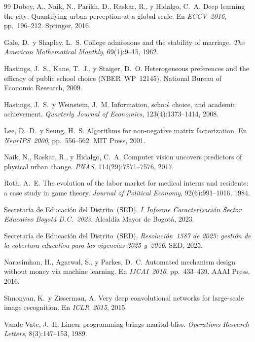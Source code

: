 \documentclass[12pt,a4paper]{article}
\begin{document}
\begin{thebibliography}{99}
Dubey, A., Naik, N., Parikh, D., Raskar, R., y Hidalgo, C.~A.
\newblock Deep learning the city: Quantifying urban perception at a global scale.
\newblock En \emph{ECCV~2016}, pp.~196--212. Springer, 2016.

Gale, D.\ y Shapley, L.~S.
\newblock College admissions and the stability of marriage.
\newblock \emph{The American Mathematical Monthly}, 69(1):9--15, 1962.

Hastings, J.~S., Kane, T.~J., y Staiger, D.~O.
\newblock Heterogeneous preferences and the efficacy of public school choice
(NBER~WP~12145).
\newblock National Bureau of Economic Research, 2009.

Hastings, J.~S.\ y Weinstein, J.~M.
\newblock Information, school choice, and academic achievement.
\newblock \emph{Quarterly Journal of Economics}, 123(4):1373--1414, 2008.

Lee, D.~D.\ y Seung, H.~S.
\newblock Algorithms for non-negative matrix factorization.
\newblock En \emph{NeurIPS~2000}, pp.~556--562. MIT Press, 2001.

Naik, N., Raskar, R., y Hidalgo, C.~A.
\newblock Computer vision uncovers predictors of physical urban change.
\newblock \emph{PNAS}, 114(29):7571--7576, 2017.

Roth, A.~E.
\newblock The evolution of the labor market for medical interns and residents:
a case study in game theory.
\newblock \emph{Journal of Political Economy}, 92(6):991--1016, 1984.

Secretaría de Educación del Distrito~(SED).
\newblock \emph{I~Informe Caracterización Sector Educativo Bogotá D.C.\ 2023}.
\newblock Alcaldía Mayor de Bogotá, 2023.

Secretaría de Educación del Distrito~(SED).
\newblock \emph{Resolución~1587 de 2025: gestión de la cobertura educativa
  para las vigencias 2025 y~2026}.
\newblock SED, 2025.

Narasimhan, H., Agarwal, S., y Parkes, D.~C.
\newblock Automated mechanism design without money via machine learning.
\newblock En \emph{IJCAI~2016}, pp.~433--439. AAAI Press, 2016.

Simonyan, K.\ y Zisserman, A.
\newblock Very deep convolutional networks for large-scale image recognition.
\newblock En \emph{ICLR~2015}, 2015.

Vande Vate, J.~H.
\newblock Linear programming brings marital bliss.
\newblock \emph{Operations Research Letters}, 8(3):147--153, 1989.

\end{thebibliography}
\end{document}
